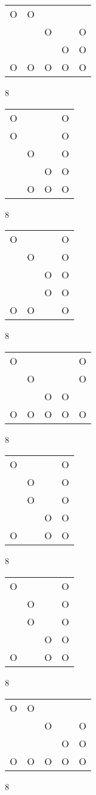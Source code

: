 \begin{tabular}{|m{0.2cm}m{0.2cm}m{0.2cm}m{0.2cm}m{0.2cm}|}\hline
O&O& & & \\
 & &O& &O\\
 & & &O&O\\
O&O&O&O&O\\
\hline\end{tabular}8
\begin{tabular}{|m{0.2cm}m{0.2cm}m{0.2cm}m{0.2cm}|}\hline
O& & &O\\
O& & &O\\
 &O& &O\\
 & &O&O\\
 &O&O&O\\
\hline\end{tabular}8
\begin{tabular}{|m{0.2cm}m{0.2cm}m{0.2cm}m{0.2cm}|}\hline
O& & &O\\
 &O& &O\\
 & &O&O\\
 & &O&O\\
O&O& &O\\
\hline\end{tabular}8
\begin{tabular}{|m{0.2cm}m{0.2cm}m{0.2cm}m{0.2cm}m{0.2cm}|}\hline
O& & & &O\\
 &O& & &O\\
 & &O&O& \\
O&O&O&O&O\\
\hline\end{tabular}8
\begin{tabular}{|m{0.2cm}m{0.2cm}m{0.2cm}m{0.2cm}|}\hline
O& & &O\\
 &O& &O\\
 &O& &O\\
 & &O&O\\
O& &O&O\\
\hline\end{tabular}8
\begin{tabular}{|m{0.2cm}m{0.2cm}m{0.2cm}m{0.2cm}|}\hline
O& & &O\\
 &O& &O\\
 &O& &O\\
 & &O&O\\
O& &O&O\\
\hline\end{tabular}8
\begin{tabular}{|m{0.2cm}m{0.2cm}m{0.2cm}m{0.2cm}m{0.2cm}|}\hline
O&O& & & \\
 & &O& &O\\
 & & &O&O\\
O&O&O&O&O\\
\hline\end{tabular}8
